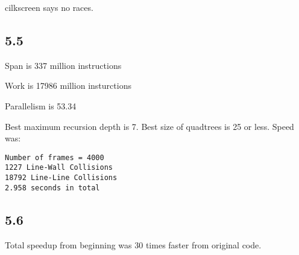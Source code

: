 \documentclass[12pt]{article}
\begin{document}
cilkscreen says no races.  
\subsection{5.5}
Span is 337 million instructions

Work is 17986 million insturctions

Parallelism is 53.34

Best maximum recursion depth is 7.  Best size of quadtrees is 25 or less.  Speed
was:
\begin{verbatim}
Number of frames = 4000
1227 Line-Wall Collisions
18792 Line-Line Collisions
2.958 seconds in total
\end{verbatim}


\subsection{5.6}
Total speedup from beginning was 30 times faster from original code.  
\end{document}
